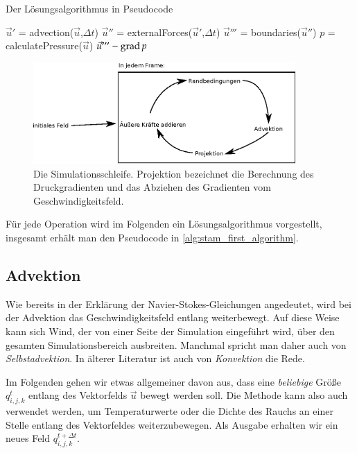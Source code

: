 \begin{algorithm}
\caption{Der Lösungsalgorithmus in Pseudocode}
\label{alg:stam_first_algorithm}
\begin{algorithmic}
	\State $\vec{u}'$ = advection($\vec{u}$,$\Delta t$)
	\State $\vec{u}''$ = externalForces($\vec{u}'$,$\Delta t$)
	\State $\vec{u}'''$ = boundaries($\vec{u}''$)
	\State $p$ = calculatePressure($\vec{u}$)
	\State \Return $\vec{u}''' - \operatorname*{grad} p$
\EndFunction
\end{algorithmic}
\end{algorithm}

\begin{figure}[ht]
\includegraphics[width=10cm]{images/stam_loop_with_projection}
\caption{Die Simulationsschleife. Projektion bezeichnet die Berechnung des Druckgradienten und das Abziehen des Gradienten vom Geschwindigkeitsfeld.}
\end{figure}

Für jede Operation wird im Folgenden ein Lösungsalgorithmus
vorgestellt, insgesamt erhält man den Pseudocode in
\autoref{alg:stam_first_algorithm}.

\subsection{Advektion}
\label{sec:stam_advection}

Wie bereits in der Erklärung der Navier-Stokes-Gleichungen angedeutet, wird bei
der Advektion das Geschwindigkeitsfeld entlang 
weiterbewegt. Auf diese Weise kann sich Wind, der von einer Seite der
Simulation eingeführt wird, über den gesamten Simulationsbereich ausbreiten.
Manchmal spricht man daher auch von \emph{Selbstadvektion}. In älterer Literatur
ist auch von \emph{Konvektion} die Rede.

Im Folgenden gehen wir etwas allgemeiner davon aus, dass eine \emph{beliebige} Größe
$q_{i,j,k}^t$ entlang des Vektorfelds $\vec{u}$ bewegt werden soll. Die Methode
 kann also auch verwendet werden, um
Temperaturwerte oder die Dichte des Rauchs an einer Stelle entlang des
Vektorfeldes weiterzubewegen. Als Ausgabe erhalten wir ein neues Feld
$q_{i,j,k}^{t+\Delta t}$.


